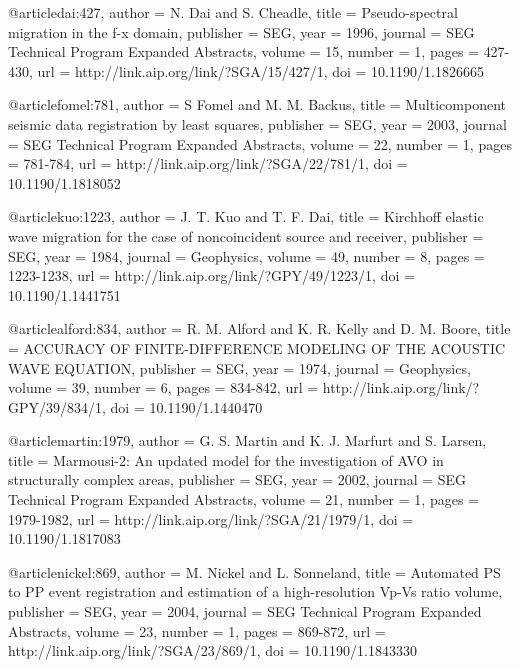 {@article{dai:427,
  author =	 {N. Dai and S. Cheadle},
  title =	 {Pseudo-spectral migration in the f-x domain},
  publisher =	 {SEG},
  year =	 1996,
  journal =	 {SEG Technical Program Expanded Abstracts},
  volume =	 15,
  number =	 1,
  pages =	 {427-430},
  url =		 {http://link.aip.org/link/?SGA/15/427/1},
  doi =		 {10.1190/1.1826665}
}

@article{fomel:781,
  author =	 {S Fomel and M. M. Backus},
  title =	 {Multicomponent seismic data registration by least
                  squares},
  publisher =	 {SEG},
  year =	 2003,
  journal =	 {SEG Technical Program Expanded Abstracts},
  volume =	 22,
  number =	 1,
  pages =	 {781-784},
  url =		 {http://link.aip.org/link/?SGA/22/781/1},
  doi =		 {10.1190/1.1818052}
}

@article{kuo:1223,
  author =	 {J. T. Kuo and T. F. Dai},
  title =	 {Kirchhoff elastic wave migration for the case of
                  noncoincident source and receiver},
  publisher =	 {SEG},
  year =	 1984,
  journal =	 {Geophysics},
  volume =	 49,
  number =	 8,
  pages =	 {1223-1238},
  url =		 {http://link.aip.org/link/?GPY/49/1223/1},
  doi =		 {10.1190/1.1441751}
}

@article{alford:834,
  author =	 {R. M. Alford and K. R. Kelly and D. M. Boore},
  title =	 {ACCURACY OF FINITE-DIFFERENCE MODELING OF THE
                  ACOUSTIC WAVE EQUATION},
  publisher =	 {SEG},
  year =	 1974,
  journal =	 {Geophysics},
  volume =	 39,
  number =	 6,
  pages =	 {834-842},
  url =		 {http://link.aip.org/link/?GPY/39/834/1},
  doi =		 {10.1190/1.1440470}
}

@article{martin:1979,
  author =	 {G. S. Martin and K. J. Marfurt and S. Larsen},
  title =	 {Marmousi-2: An updated model for the investigation
                  of AVO in structurally complex areas},
  publisher =	 {SEG},
  year =	 2002,
  journal =	 {SEG Technical Program Expanded Abstracts},
  volume =	 21,
  number =	 1,
  pages =	 {1979-1982},
  url =		 {http://link.aip.org/link/?SGA/21/1979/1},
  doi =		 {10.1190/1.1817083}
}

@article{nickel:869,
  author =	 {M. Nickel and L. Sonneland},
  title =	 {Automated {PS} to {PP} event registration and
                  estimation of a high-resolution {V}p-{V}s ratio
                  volume},
  publisher =	 {SEG},
  year =	 2004,
  journal =	 {SEG Technical Program Expanded Abstracts},
  volume =	 23,
  number =	 1,
  pages =	 {869-872},
  url =		 {http://link.aip.org/link/?SGA/23/869/1},
  doi =		 {10.1190/1.1843330}
}

}
